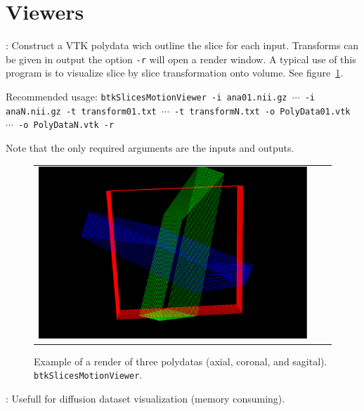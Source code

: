 \newpage
\section{Viewers}
\label{sec:viewers}

\begin{description}
\item[btkSlicesMotionViewer]: Construct a VTK polydata wich outline the slice for each input. Transforms can be given in output the option \texttt{-r} will open a render window.
A typical use of this program is to visualize slice by slice transformation onto volume. See figure~\ref{fig:btkSlicesMotionViewer}.

Recommended usage: \texttt{btkSlicesMotionViewer -i ana01.nii.gz $\cdots$ -i anaN.nii.gz -t transform01.txt $\cdots$ -t transformN.txt -o PolyData01.vtk $\cdots$ -o PolyDataN.vtk -r }

Note that the only required arguments are the inputs and outputs.

\begin{figure}[t]
\centering
\begin{tabular}{ccc}
\includegraphics[width=0.5\columnwidth]{btkSlicesMotionViewer.eps}
\end{tabular}
\caption{Example of a render of three polydatas (axial, coronal, and sagital).
\texttt{btkSlicesMotionViewer}.}
\label{fig:btkSlicesMotionViewer}
\end{figure}

\item[btkDiffusionViewer]: Usefull for diffusion dataset visualization (memory consuming).

\end{description}

